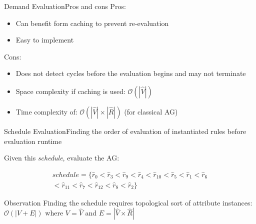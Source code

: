 
\begin{frame}{Demand Evaluation}{Pros and cons}
Pros:
\begin{itemize}
    \item Can benefit form \alert{caching to prevent re-evaluation}
    \item Easy to implement
\end{itemize}

Cons:
\begin{itemize}
    \item Does not detect cycles before the evaluation begins and \alert{may not terminate}
    \item Space complexity if \alert{caching} is used: $\mathcal{O}(|\hat{V}|)$
    \item Time complexity of: $\mathcal{O}(| \hat{V} | \times | \hat{R} |)$ (for classical AG)
\end{itemize}
\end{frame}



\begin{frame}{Schedule Evaluation}{Finding the order of evaluation of instantiated rules before evaluation runtime}

Given this \emph{schedule}, evaluate the AG:

\begin{equation}
\begin{split}
\mathit{schedule} = \Big \{\hat{r}_0 < \hat{r}_3 < \hat{r}_9 < \hat{r}_4 < \hat{r}_{10} < \hat{r}_5 < \hat{r}_1 < \hat{r}_6 \\
< \hat{r}_{11} < \hat{r}_7 < \hat{r}_{12} < \hat{r}_8 < \hat{r}_2 \Big \}    
\end{split}
\end{equation}

\begin{alertblock}{Observation}
Finding the schedule requires topological sort of attribute instances: $\mathcal{O}(| V +  E|)$ where $V = \hat{V}$ and $E = |\hat{V}  \times  \hat{R}|$
\end{alertblock}
\end{frame}

